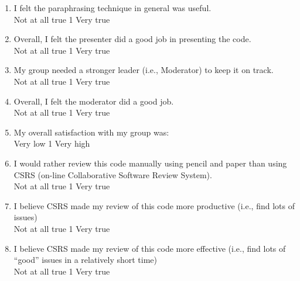 \begin {enumerate}
\item I felt the paraphrasing technique in general was useful.
\\
Not at all true \hfill 1     \hfill Very true\\


\item Overall, I felt the presenter did a good job in presenting
the code.
\\
Not at all true \hfill 1     \hfill Very true\\


\item My group needed a stronger leader (i.e., Moderator) to keep it on track.
\\
Not at all true \hfill 1     \hfill Very true\\

\item Overall, I felt the moderator did a good job.
\\
Not at all true \hfill 1     \hfill Very true\\

\item My overall satisfaction with my group was:
\\
Very low \hfill 1     \hfill Very high\\


\item I would rather review this code manually using pencil and paper than
using CSRS (on-line Collaborative Software Review System).
\\
Not at all true \hfill 1     \hfill Very true\\


\item I believe CSRS made my review of this code more productive
(i.e., find lots of issues)
\\
Not at all true \hfill 1     \hfill Very true\\

\item I believe CSRS made my review of this code more effective
(i.e., find lots of ``good'' issues in a relatively short time)
\\
Not at all true \hfill 1     \hfill Very true\\


\end{enumerate}
